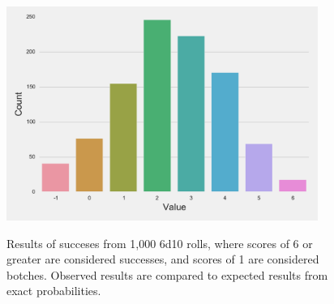 \documentclass{article}
\begin{document}
\begin{figure}[H]
\begin{floatrow}
\includegraphics[width=4in]{6d10_min6_botching.pdf}
{%
}
\end{floatrow}
\caption{Results of succeses from 1,000 6d10 rolls, where scores of 6 or greater are considered successes, and scores of 1 are considered botches. Observed results are compared to expected results from exact probabilities.}
\end{figure}

\end{document}
